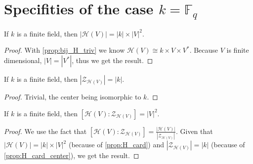 \section{Specifities of the case $k=\mathbb{F}_q$}

\begin{proposition}[Cardinality]
    \label{prop:H_card}
    \leanok
    If $k$ is a finite field, then $|\mathcal{H}(V)|=|k|\times|V|^2$.
\end{proposition}
\begin{proof}
    \leanok
    With \ref{prop:bij_H_triv} we know $\mathcal{H}(V)\cong k \times V \times V^*$.
    Because $V$ is finite dimensional, $|V|=|V^*|$, thus we get the result.
\end{proof}

\begin{proposition}
    \label{prop:H_card_center}
    \leanok
    If $k$ is a finite field, then $|\mathcal{Z}_{\mathcal{H}(V)}|=|k|$.
\end{proposition}
\begin{proof}
    \leanok
    Trivial, the center being isomorphic to $k$.
\end{proof}

\begin{theorem}
    \label{thm:H_index_center}
    \leanok

    If $k$ is a finite field, then $[\mathcal{H}(V):\mathcal{Z}_{\mathcal{H}(V)}]=|V|^2$.
\end{theorem}
\begin{proof}
    \leanok
    We use the fact that $[\mathcal{H}(V):\mathcal{Z}_{\mathcal{H}(V)}]=\frac{|\mathcal{H}(V)|}{|\mathcal{Z}_{\mathcal{H}(V)}|}$.
    Given that $|\mathcal{H}(V)|=|k|\times|V|^2$ (because of \ref{prop:H_card}) and $|\mathcal{Z}_{\mathcal{H}(V)}|=|k|$ (because of \ref{prop:H_card_center}), we get the result.
\end{proof}
